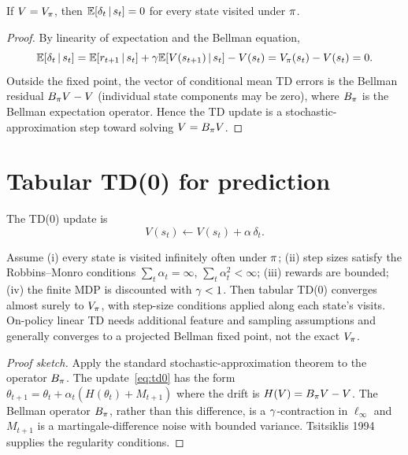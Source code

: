 \documentclass[11pt,oneside]{scrbook}
\begin{document}
\begin{theorem}
\label{thm:td-unbiased}
If $V = V_\pi$, then $\mathbb{E}[\delta_t \,\vert\, s_t] = 0$ for every state visited under
$\pi$.
\end{theorem}

\begin{proof}
By linearity of expectation and the Bellman equation,
\[
  \mathbb{E}[\delta_t\,\vert\, s_t] = \mathbb{E}[r_{t+1}\,\vert\, s_t] + \gamma \mathbb{E}[V(s_{t+1})\,\vert\, s_t] - V(s_t)
  = V_\pi(s_t) - V(s_t) = 0.
\]
Outside the fixed point, the vector of conditional mean TD errors is the
Bellman residual $B_\pi V - V$ (individual state components may be zero),
where $B_\pi$ is the Bellman expectation
operator. Hence the TD update is a stochastic-approximation step toward solving
$V = B_\pi V$.
\end{proof}

\section{Tabular TD(0) for prediction}

The TD(0) update is
\begin{equation}
  V(s_t) \leftarrow V(s_t) + \alpha\, \delta_t.
  \label{eq:td0}
\end{equation}

\begin{theorem}
\label{thm:td-convergence}
Assume (i) every state is visited infinitely often under $\pi$; (ii) step sizes satisfy
the Robbins--Monro conditions $\sum_t \alpha_t = \infty$, $\sum_t \alpha_t^2 < \infty$;
(iii) rewards are bounded; (iv) the finite MDP is discounted with $\gamma<1$.
Then tabular TD(0) converges almost surely to $V_\pi$, with step-size
conditions applied along each state's visits. On-policy linear TD needs
additional feature and sampling assumptions and generally converges to a
projected Bellman fixed point, not the exact $V_\pi$.
\end{theorem}

\begin{proof}[Proof sketch]
Apply the standard stochastic-approximation theorem to the operator $B_\pi$. The
update~\eqref{eq:td0} has the form $\theta_{t+1} = \theta_t + \alpha_t(H(\theta_t) +
M_{t+1})$ where the drift is $H(V)=B_\pi V-V$. The Bellman operator
$B_\pi$, rather than this difference, is a $\gamma$-contraction in $\ell_\infty$ and $M_{t+1}$ is a martingale-difference noise with
bounded variance. Tsitsiklis 1994 supplies the regularity conditions.
\end{proof}
\end{document}
